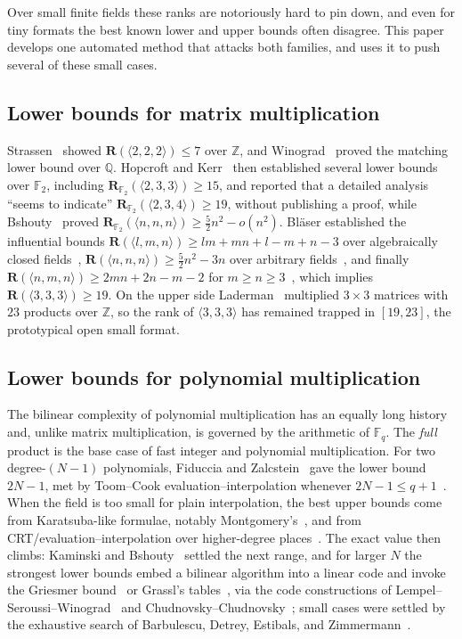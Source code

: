 \documentclass[11pt]{article}
\theoremstyle{definition}
\newcommand{\F}{\mathbb{F}}
\newcommand{\R}{\mathbf{R}}
\newcommand{\Rk}[2]{\mathbf{R}_{#1}(#2)}
\newcommand{\mmt}[3]{\langle #1,#2,#3\rangle}
\begin{document}
Over small finite fields these ranks are notoriously hard to pin down, and even
for tiny formats the best known lower and upper bounds often disagree. This paper
develops one automated method that attacks both families, and uses it to push
several of these small cases.

\subsection{Lower bounds for matrix multiplication}

Strassen~\cite{strassen1969gaussian} showed $\R(\mmt{2}{2}{2})\le 7$ over $\mathbb{Z}$, and
Winograd~\cite{winograd1971multiplication} proved the matching lower bound over $\mathbb{Q}$.
Hopcroft and Kerr~\cite{hopcroft1971minimizing} then established several lower
bounds over $\F_2$, including $\Rk{\F_2}{\mmt{2}{3}{3}}\ge 15$, and reported that a
detailed analysis ``seems to indicate'' $\Rk{\F_2}{\mmt{2}{3}{4}}\ge 19$, without
publishing a proof, while
Bshouty~\cite{bshouty1989lower} proved $\Rk{\F_2}{\mmt{n}{n}{n}}\ge \tfrac{5}{2}n^2-o(n^2)$.
Bl\"aser established the influential bounds
$\R(\mmt{l}{m}{n})\ge lm+mn+l-m+n-3$ over algebraically closed
fields~\cite{blaser1999lower}, $\R(\mmt{n}{n}{n})\ge \tfrac{5}{2}n^2-3n$ over
arbitrary fields~\cite{blaser1999fivehalf}, and finally
$\R(\mmt{n}{m}{n})\ge 2mn+2n-m-2$ for $m\ge n\ge 3$~\cite{blaser2003complexity},
which implies $\R(\mmt{3}{3}{3})\ge 19$. On the upper side
Laderman~\cite{laderman1976noncommutative} multiplied $3\times 3$ matrices with
$23$ products over $\mathbb{Z}$, so the rank of $\mmt{3}{3}{3}$ has remained trapped in $[19,23]$,
the prototypical open small format.

\subsection{Lower bounds for polynomial multiplication}

The bilinear complexity of polynomial multiplication has an equally long history
and, unlike matrix multiplication, is governed by the arithmetic of $\F_q$. The
\emph{full} product is the base case of fast integer and polynomial multiplication.
For two degree-$(N-1)$ polynomials, Fiduccia and Zalcstein~\cite{fiduccia1977algebras}
gave the lower bound $2N-1$, met by Toom--Cook evaluation--interpolation whenever
$2N-1\le q+1$~\cite{toom1963complexity}. When the field is too small for plain
interpolation, the best upper bounds come from Karatsuba-like formulae, notably
Montgomery's~\cite{montgomery2005five}, and from CRT/evaluation--interpolation over
higher-degree places~\cite{winograd1977some}. The exact value then climbs: Kaminski
and Bshouty~\cite{kaminski1989multiplicative} settled the next range, and for larger
$N$ the strongest lower bounds embed a bilinear algorithm into a linear code and
invoke the Griesmer bound~\cite{griesmer1960bound} or Grassl's
tables~\cite{grassl2007codetables}, via the code constructions of
Lempel--Seroussi--Winograd~\cite{lempel1983complexity} and
Chudnovsky--Chudnovsky~\cite{chudnovsky1988algebraic}; small cases were settled by
the exhaustive search of Barbulescu, Detrey, Estibals, and
Zimmermann~\cite{barbulescu2012finding}.
\end{document}
